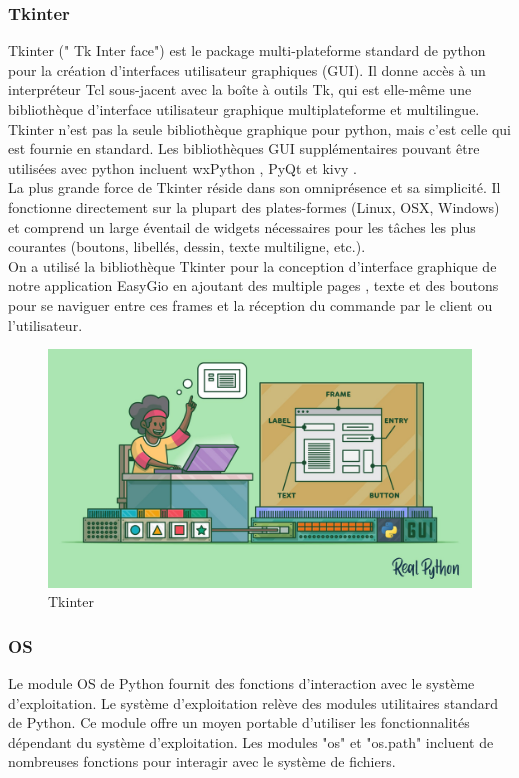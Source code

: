 \documentclass[a4paper]{report}
\begin{document}
\subsubsection{Tkinter}
Tkinter (" Tk Inter face") est le package multi-plateforme standard de python pour la création d'interfaces utilisateur graphiques (GUI). Il donne accès à un interpréteur Tcl sous-jacent avec la boîte à outils Tk, qui est elle-même une bibliothèque d'interface utilisateur graphique multiplateforme et multilingue.
Tkinter n'est pas la seule bibliothèque graphique pour python, mais c'est celle qui est fournie en standard. Les bibliothèques GUI supplémentaires pouvant être utilisées avec python incluent wxPython , PyQt et kivy .\\
La plus grande force de Tkinter réside dans son omniprésence et sa simplicité. Il fonctionne directement sur la plupart des plates-formes (Linux, OSX, Windows) et comprend un large éventail de widgets nécessaires pour les tâches les plus courantes (boutons, libellés, dessin, texte
multiligne, etc.).\\
On a utilisé la bibliothèque Tkinter pour la conception d'interface graphique de notre application EasyGio  en ajoutant des multiple pages , texte et des boutons pour se naviguer entre ces frames et la réception du commande par le client ou l'utilisateur. 
\begin{figure}[!h]
    \centering
    \includegraphics[width=13cm]{images/Tkinter.png}
    \caption{Tkinter}
    \label{Tkinter}
\end{figure}
\subsubsection{OS}
Le module OS de Python fournit des fonctions d'interaction avec le système d'exploitation. Le système d'exploitation relève des modules utilitaires standard de Python. Ce module offre un moyen portable d'utiliser les fonctionnalités dépendant du système d'exploitation. Les modules "os" et "os.path" incluent de nombreuses fonctions pour interagir avec le système de fichiers.\\
\end{document}
